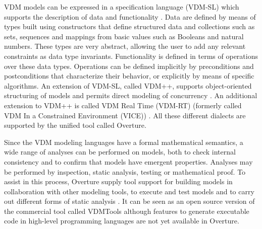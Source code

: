 \documentclass{overturerep}
\begin{document}
{VDM models can be expressed in a specification language (VDM-SL) which
supports the description of data and functionality
\cite{ISOVDM96a,Fitzgerald&98b,Fitzgerald&09}. Data are defined by
means of types built using constructors that define structured data
and collections such as sets, sequences and mappings from basic values
such as Booleans and natural numbers. These types are very abstract, allowing
the user to add any relevant constraints as data type
invariants. Functionality is defined in terms of operations over these
data types. Operations can be defined implicitly by preconditions and
postconditions that characterize their behavior, or explicitly by
means of specific algorithms. An extension of VDM-SL, called VDM++,
supports object-oriented structuring of models and permits direct
modeling of concurrency \cite{Fitzgerald&05}. An additional extension
to VDM++ is called VDM Real Time (VDM-RT) (formerly called VDM In a
Constrained Environment (VICE)) \cite{Mukherjee&00,Verhoef&06b}. All
these different dialects are supported by the unified tool called Overture.

Since the VDM modeling languages have a formal mathematical semantics,
a wide range of analyses can be performed on models, both to check
internal consistency and to confirm that models have emergent
properties. Analyses may be performed by inspection, static analysis,
testing or mathematical proof. To assist in this process, Overture
supply tool support for building models in collaboration with other
modeling tools, to execute and test models and to carry out different
forms of static analysis \cite{Larsen&10a}. It can be seen as an open
source version of the commercial tool called VDMTools
\cite{Elmstrom&94,Larsen01,Fitzgerald&08a} although features to
generate executable code in high-level programming languages are
not yet available in Overture.

}
\end{document}
